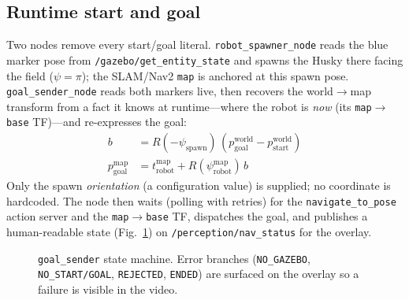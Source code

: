 \documentclass[10pt,journal,twoside]{IEEEtran}
\begin{document}
\subsection{Runtime start and goal}
Two nodes remove every start/goal literal. \texttt{robot\_spawner\_node} reads the blue marker pose from \texttt{/gazebo/get\_entity\_state} and spawns the Husky there facing the field ($\psi{=}\pi$); the SLAM/Nav2 \texttt{map} is anchored at this spawn pose. \texttt{goal\_sender\_node} reads both markers live, then recovers the world$\rightarrow$map transform from a fact it knows at runtime---where the robot is \emph{now} (its \texttt{map$\rightarrow$base} TF)---and re-expresses the goal:
\begin{align}
b &= R(-\psi_{\text{spawn}})\,(p^{\text{world}}_{\text{goal}} - p^{\text{world}}_{\text{start}})\\
p^{\text{map}}_{\text{goal}} &= t_{\text{robot}}^{\text{map}} + R(\psi_{\text{robot}}^{\text{map}})\,b
\end{align}
Only the spawn \emph{orientation} (a configuration value) is supplied; no coordinate is hardcoded. The node then waits (polling with retries) for the \texttt{navigate\_to\_pose} action server and the \texttt{map$\rightarrow$base} TF, dispatches the goal, and publishes a human-readable state (Fig.~\ref{fig:fsm}) on \texttt{/perception/nav\_status} for the overlay.

\begin{figure}[!t]
\centering
{}
\caption{\texttt{goal\_sender} state machine. Error branches (\texttt{NO\_GAZEBO}, \texttt{NO\_START/GOAL}, \texttt{REJECTED}, \texttt{ENDED}) are surfaced on the overlay so a failure is visible in the video.}
\label{fig:fsm}
\end{figure}
\end{document}
